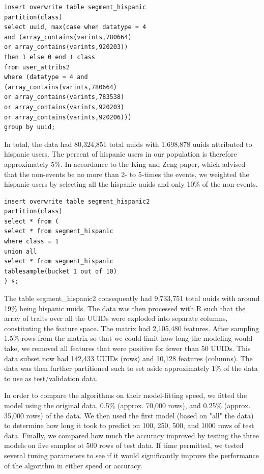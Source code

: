 \documentclass[twoside]{article}
\begin{document}
\begin{multicols}{2}
\begin{verbatim}
insert overwrite table segment_hispanic 
partition(class)
select uuid, max(case when datatype = 4 
and (array_contains(varints,780664) 
or array_contains(varints,920203))
then 1 else 0 end ) class
from user_attribs2
where (datatype = 4 and 
(array_contains(varints,780664) 
or array_contains(varints,783538) 
or array_contains(varints,920203) 
or array_contains(varints,920206)))
group by uuid;
\end{verbatim}

In total, the data had 80,324,851 total uuids with 1,698,878 uuids attributed to hispanic users. The percent of hispanic users in our population is therefore approximately 5\%. In accordance to the King and Zeng paper, which advised that the non-events be no more than 2- to 5-times the events, we weighted the hispanic users by selecting all the hispanic uuids and only 10\% of the non-events.

\begin{verbatim}
insert overwrite table segment_hispanic2
partition(class)
select * from ( 
select * from segment_hispanic 
where class = 1 
union all 
select * from segment_hispanic 
tablesample(bucket 1 out of 10)
) s;
\end{verbatim}

The table segment\_hispanic2 consequently had 9,733,751 total uuids with around 19\% being hispanic uuids. The data was then processed with R such that the array of traits over all the UUIDs were exploded into separate columns, constituting the feature space. The matrix had 2,105,480 features. After sampling 1.5\% rows from the matrix so that we could limit how long the modeling would take, we removed all features  that were positive for fewer than 50 UUIDs. This data subset now had 142,433 UUIDs (rows) and 10,128 features (columns). The data was then further partitioned such to set aside approximately 1\% of the data to use as test/validation data.

In order to compare the algorithms on their model-fitting speed, we fitted the model using the original data, 0.5\% (approx. 70,000 rows), and 0.25\% (approx. 35,000 rows) of the data. We then used the first model (based on "all" the data) to determine how long it took to predict on 100, 250, 500, and 1000 rows of test data. Finally, we compared how much the accuracy improved by testing the three models on five samples ot 500 rows of test data. If time permitted, we tested several tuning parameters to see if it would significantly improve the performance of the algorithm in either speed or accuracy.


\end{multicols}
\end{document}
